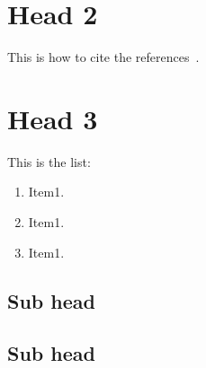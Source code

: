 \section{Head 2}
This is how to cite the references~\cite{gasparini2007earthquake, allen2019earthquake}.

\lipsum[1]

\section{Head 3}
This is the list:
\begin{enumerate}
    \item Item1.
    \item Item1.
    \item Item1.
\end{enumerate}



\subsection{Sub head}
\lipsum[1]

\subsection{Sub head}
\lipsum[2]

